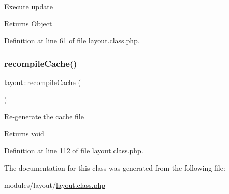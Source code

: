 Execute update \begin{DoxyReturn}{Returns}
\hyperlink{classObject}{Object} 
\end{DoxyReturn}


Definition at line 61 of file layout.\+class.\+php.

\mbox{\label{classlayout_ada8199439f32bd6bbb63ce85a52a7c61}} 
\subsubsection{\texorpdfstring{recompile\+Cache()}{recompileCache()}}
{\footnotesize\ttfamily layout\+::recompile\+Cache (\begin{DoxyParamCaption}{ }\end{DoxyParamCaption})}

Re-\/generate the cache file \begin{DoxyReturn}{Returns}
void 
\end{DoxyReturn}


Definition at line 112 of file layout.\+class.\+php.



The documentation for this class was generated from the following file\+:\begin{DoxyCompactItemize}
\item 
modules/layout/\hyperlink{layout_8class_8php}{layout.\+class.\+php}\end{DoxyCompactItemize}
